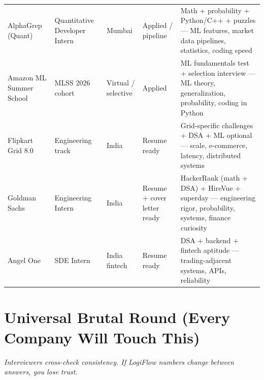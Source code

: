 \documentclass[9pt,a4paper]{article}
\begin{document}
\begin{longtable}{@{}p{2.2cm}p{3.5cm}p{2cm}p{1.5cm}p{5cm}@{}}
AlphaGrep (Quant) & Quantitative Developer Intern & Mumbai & Applied / pipeline & Math + probability + Python/C++ + puzzles --- ML features, market data pipelines, statistics, coding speed \\
Amazon ML Summer School & MLSS 2026 cohort & Virtual / selective & Applied & ML fundamentals test + selection interview --- ML theory, generalization, probability, coding in Python \\
Flipkart Grid 8.0 & Engineering track & India & Resume ready & Grid-specific challenges + DSA + ML optional --- scale, e-commerce, latency, distributed systems \\
Goldman Sachs & Engineering Intern & India & Resume + cover letter ready & HackerRank (math + DSA) + HireVue + superday --- engineering rigor, probability, systems, finance curiosity \\
Angel One & SDE Intern & India fintech & Resume ready & DSA + backend + fintech aptitude --- trading-adjacent systems, APIs, reliability \\
\bottomrule
\end{longtable}

\newpage
\section{Universal Brutal Round (Every Company Will Touch This)}
\textit{Interviewers cross-check consistency. If LogiFlow numbers change between answers, you lose trust.}
\end{document}
